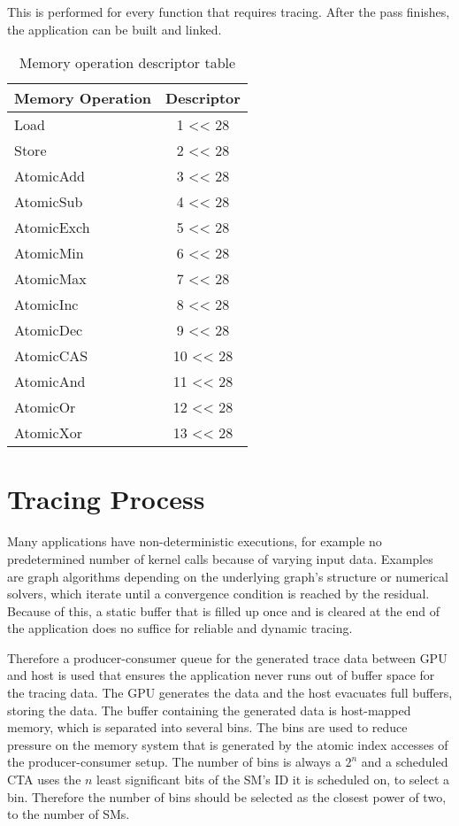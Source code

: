This is performed for every function that requires tracing. After the pass finishes, the application can be built
and linked.
\begin{table}[t]
	\centering
\begin{tabular}{|l|c|}
	\hline 
	Memory Operation & Descriptor \\ 
	\hline 
	Load & 1 << 28 \\ 
	\hline 
	Store & 2 << 28 \\ 
	\hline 
	AtomicAdd & 3 << 28 \\ 
	\hline 
	AtomicSub & 4 << 28 \\ 
	\hline 
	AtomicExch & 5 << 28 \\ 
	\hline 
	AtomicMin & 6 << 28 \\ 
	\hline 
	AtomicMax & 7 << 28 \\ 
	\hline 
	AtomicInc & 8 << 28 \\ 
	\hline 
	AtomicDec & 9 << 28 \\ 
	\hline 
	AtomicCAS & 10 << 28 \\ 
	\hline 
	AtomicAnd & 11 << 28 \\ 
	\hline 
	AtomicOr & 12 << 28 \\ 
	\hline 
	AtomicXor & 13 << 28 \\ 
	\hline 
\end{tabular} 
 \label{TypeTab}
 \caption{Memory operation descriptor table}
\end{table}


\section{Tracing Process}\label{sec:prodcons}
	Many applications have non-deterministic executions, for example no predetermined number of kernel calls because of varying input data. Examples are graph algorithms depending on the underlying graph's structure or numerical solvers, which iterate until a
	convergence condition is reached by the residual. Because of this, a static buffer that is filled up once and is cleared at the end of the application does no suffice for reliable and dynamic tracing.
	
	Therefore a producer-consumer queue for the generated trace data between GPU and host is used that ensures the application never runs out of buffer space for the tracing data. The GPU generates the data and the host evacuates full buffers, storing the data.
	The buffer containing the generated data is host-mapped memory, which is separated into several bins. The bins are used to reduce
	pressure on the memory system that is generated by the atomic index accesses of the producer-consumer setup. The number of bins 
	is always a $2^n$ and a scheduled CTA uses the  $n$ least significant bits of the SM's ID it is scheduled on, to select a bin. Therefore the number of bins should be selected as the closest power of two, to the number of SMs.

